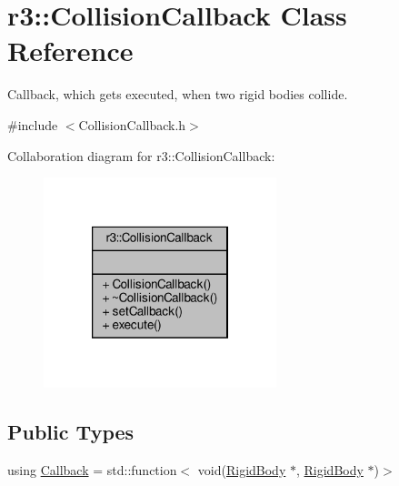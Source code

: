 \hypertarget{classr3_1_1_collision_callback}{}\section{r3\+:\+:Collision\+Callback Class Reference}
\label{classr3_1_1_collision_callback}


Callback, which gets executed, when two rigid bodies collide.  




{\ttfamily \#include $<$Collision\+Callback.\+h$>$}



Collaboration diagram for r3\+:\+:Collision\+Callback\+:\nopagebreak
\begin{figure}[H]
\begin{center}
\leavevmode
\includegraphics[width=192pt]{classr3_1_1_collision_callback__coll__graph}
\end{center}
\end{figure}
\subsection*{Public Types}
\begin{DoxyCompactItemize}
\item 
using \mbox{\hyperlink{classr3_1_1_collision_callback_afcd5494eafdbd1a0956589b6ec9c0728}{Callback}} = std\+::function$<$ void(\mbox{\hyperlink{classr3_1_1_rigid_body}{Rigid\+Body}} $\ast$, \mbox{\hyperlink{classr3_1_1_rigid_body}{Rigid\+Body}} $\ast$)$>$
\end{DoxyCompactItemize}
